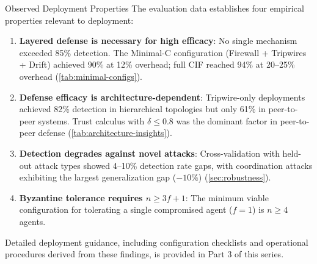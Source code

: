\documentclass[
  ignorenonframetext,
]{beamer}
\begin{document}
\begin{frame}{Observed Deployment Properties}
\protect{}\label{observed-deployment-properties}
The evaluation data establishes four empirical properties relevant to
deployment:

\begin{enumerate}
\item
  \textbf{Layered defense is necessary for high efficacy}: No single
  mechanism exceeded 85\% detection. The Minimal-C configuration
  (Firewall + Tripwires + Drift) achieved 90\% at 12\% overhead; full
  CIF reached 94\% at 20--25\% overhead (\cref{tab:minimal-configs}).
\item
  \textbf{Defense efficacy is architecture-dependent}: Tripwire-only
  deployments achieved 82\% detection in hierarchical topologies but
  only 61\% in peer-to-peer systems. Trust calculus with
  \(\delta \leq 0.8\) was the dominant factor in peer-to-peer defense
  (\cref{tab:architecture-insights}).
\item
  \textbf{Detection degrades against novel attacks}: Cross-validation
  with held-out attack types showed 4--10\% detection rate gaps, with
  coordination attacks exhibiting the largest generalization gap
  (\(-10\%\)) (\cref{sec:robustness}).
\item
  \textbf{Byzantine tolerance requires \(n \geq 3f + 1\)}: The minimum
  viable configuration for tolerating a single compromised agent
  (\(f = 1\)) is \(n \geq 4\) agents.
\end{enumerate}

Detailed deployment guidance, including configuration checklists and
operational procedures derived from these findings, is provided in Part
3 of this series.
\end{frame}
\end{document}
